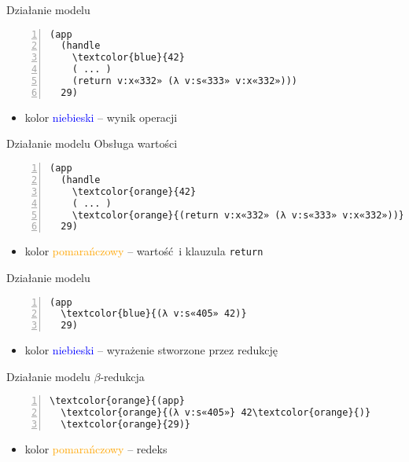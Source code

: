 \documentclass{beamer}
\begin{document}
\begin{frame}[fragile]{Działanie modelu}
\begin{Verbatim}[commandchars=\\\{\},numbers=left]
(app
  (handle
    \textcolor{blue}{42}
    ( ... )
    (return v:x«332» (λ v:s«333» v:x«332»)))
  29)
\end{Verbatim}
\begin{itemize}
  \item kolor \textcolor{blue}{niebieski} -- wynik operacji
\end{itemize}
\end{frame}

\begin{frame}[fragile]{Działanie modelu}
Obsługa wartości
\begin{Verbatim}[commandchars=\\\{\},numbers=left]
(app
  (handle
    \textcolor{orange}{42}
    ( ... )
    \textcolor{orange}{(return v:x«332» (λ v:s«333» v:x«332»))})
  29)
\end{Verbatim}
\begin{itemize}
  \item kolor \textcolor{orange}{pomarańczowy} -- wartość i klauzula \texttt{return}
\end{itemize}
\end{frame}

\begin{frame}[fragile]{Działanie modelu}
\begin{Verbatim}[commandchars=\\\{\},numbers=left]
(app 
  \textcolor{blue}{(λ v:s«405» 42)}
  29)
\end{Verbatim}
\begin{itemize}
  \item kolor \textcolor{blue}{niebieski} -- wyrażenie stworzone przez redukcję
\end{itemize}
\end{frame}

\begin{frame}[fragile]{Działanie modelu}
$\beta$-redukcja
\begin{Verbatim}[commandchars=\\\{\},numbers=left]
\textcolor{orange}{(app}
  \textcolor{orange}{(λ v:s«405»} 42\textcolor{orange}{)}
  \textcolor{orange}{29)}
\end{Verbatim}
\begin{itemize}
  \item kolor \textcolor{orange}{pomarańczowy} -- redeks
\end{itemize}
\end{frame}
\end{document}

